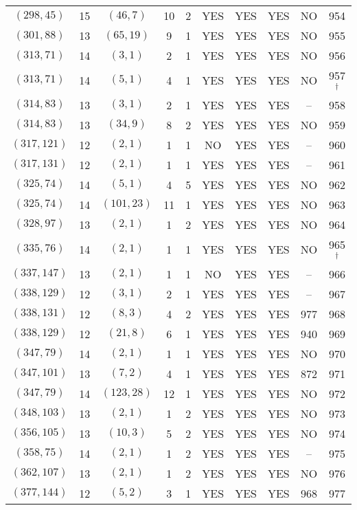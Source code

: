 \begin{longtable}{|c|c|c|c|c|c|c|c|c|c|}
$(298, 45)$ & 15 & $(46, 7)$ & 10 & 2 & YES & YES & YES & NO & 954\\
$(301, 88)$ & 13 & $(65, 19)$ & 9 & 1 & YES & YES & YES & NO & 955\\
$(313, 71)$ & 14 & $(3, 1)$ & 2 & 1 & YES & YES & YES & NO & 956\\
$(313, 71)$ & 14 & $(5, 1)$ & 4 & 1 & YES & YES & YES & NO & 957 ${}^\dagger$\\
$(314, 83)$ & 13 & $(3, 1)$ & 2 & 1 & YES & YES & YES & -- & 958\\
$(314, 83)$ & 13 & $(34, 9)$ & 8 & 2 & YES & YES & YES & NO & 959\\
$(317, 121)$ & 12 & $(2, 1)$ & 1 & 1 & NO & YES & YES & -- & 960\\
$(317, 131)$ & 12 & $(2, 1)$ & 1 & 1 & YES & YES & YES & -- & 961\\
$(325, 74)$ & 14 & $(5, 1)$ & 4 & 5 & YES & YES & YES & NO & 962\\
$(325, 74)$ & 14 & $(101, 23)$ & 11 & 1 & YES & YES & YES & NO & 963\\
$(328, 97)$ & 13 & $(2, 1)$ & 1 & 2 & YES & YES & YES & NO & 964\\
$(335, 76)$ & 14 & $(2, 1)$ & 1 & 1 & YES & YES & YES & NO & 965 ${}^\dagger$\\
$(337, 147)$ & 13 & $(2, 1)$ & 1 & 1 & NO & YES & YES & -- & 966\\
$(338, 129)$ & 12 & $(3, 1)$ & 2 & 1 & YES & YES & YES & -- & 967\\
$(338, 131)$ & 12 & $(8, 3)$ & 4 & 2 & YES & YES & YES & 977 & 968\\
$(338, 129)$ & 12 & $(21, 8)$ & 6 & 1 & YES & YES & YES & 940 & 969\\
$(347, 79)$ & 14 & $(2, 1)$ & 1 & 1 & YES & YES & YES & NO & 970\\
$(347, 101)$ & 13 & $(7, 2)$ & 4 & 1 & YES & YES & YES & 872 & 971\\
$(347, 79)$ & 14 & $(123, 28)$ & 12 & 1 & YES & YES & YES & NO & 972\\
$(348, 103)$ & 13 & $(2, 1)$ & 1 & 2 & YES & YES & YES & NO & 973\\
$(356, 105)$ & 13 & $(10, 3)$ & 5 & 2 & YES & YES & YES & NO & 974\\
$(358, 75)$ & 14 & $(2, 1)$ & 1 & 2 & YES & YES & YES & -- & 975\\
$(362, 107)$ & 13 & $(2, 1)$ & 1 & 2 & YES & YES & YES & NO & 976\\
$(377, 144)$ & 12 & $(5, 2)$ & 3 & 1 & YES & YES & YES & 968 & 977\\

\end{longtable}
